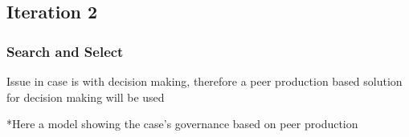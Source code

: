 \subsection{Iteration 2}

\subsubsection*{Search and Select}

Issue in case is with decision making, therefore a peer production based solution for decision making will be used

*Here a model showing the case's governance based on peer production

